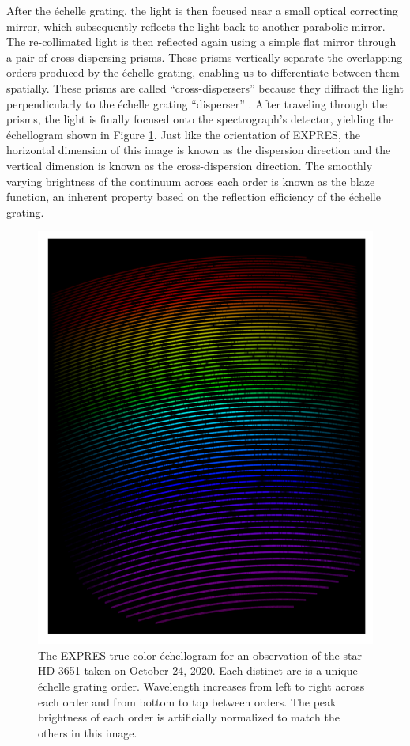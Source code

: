After the \'echelle grating, the light is then focused near a small optical correcting mirror, which subsequently reflects the light back to another parabolic mirror. The re-collimated light is then reflected again using a simple flat mirror through a pair of cross-dispersing prisms. These prisms vertically separate the overlapping orders produced by the \'echelle grating, enabling us to differentiate between them spatially. These prisms are called ``cross-dispersers'' because they diffract the light perpendicularly to the \'echelle grating ``disperser'' . After traveling through the prisms, the light is finally focused onto the spectrograph's detector, yielding the \'echellogram shown in Figure \ref{fig:expres-format}. Just like the orientation of EXPRES, the horizontal dimension of this image is known as the dispersion direction and the vertical dimension is known as the cross-dispersion direction. The smoothly varying brightness of the continuum across each order is known as the blaze function, an inherent property based on the reflection efficiency of the \'echelle grating.

\begin{figure}
    \centering
    \includegraphics[width=\textwidth]{figures-1/expres-format.pdf}
    \caption{The EXPRES true-color \'echellogram for an observation of the star HD 3651 taken on October 24, 2020. Each distinct arc is a unique \'echelle grating order. Wavelength increases from left to right across each order and from bottom to top between orders. The peak brightness of each order is artificially normalized to match the others in this image.}
    \label{fig:expres-format}
\end{figure}

